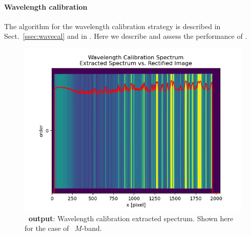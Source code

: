 \paragraph{Wavelength calibration}\label{sec:critalg_wavecal}

The algorithm for the wavelength calibration strategy is described in Sect.~\ref{ssec:wavecal} and in \cite{pis02, pis21}. Here we describe and assess the performance of \pyred. 




\begin{figure}[!h]
  \centering
  \includegraphics[width=\textwidth]{figures/LSS_CrtAlg_files/Figure_12.png}
  \caption{\textbf{\pyred~output}: Wavelength calibration extracted spectrum. Shown here for the case of \lss~$M$-band.}
  \label{fig:fig9}
\end{figure}

